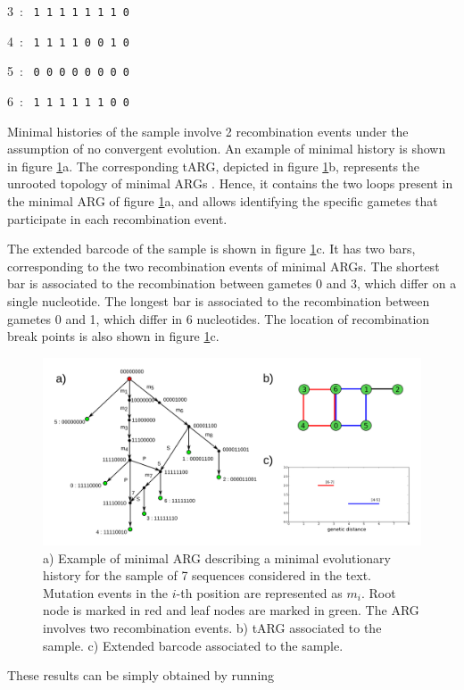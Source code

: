 \documentclass[12pt]{article}
\begin{document}
3\ : \ \texttt{1 1 1 1 1 1 1 0}

4\ : \ \texttt{1 1 1 1 0 0 1 0}

5\ : \ \texttt{0 0 0 0 0 0 0 0}

6\ : \ \texttt{1 1 1 1 1 1 0 0}

\noindent Minimal histories of the sample involve 2 recombination events under the assumption of no convergent evolution. An example of minimal history is shown in figure \ref{fig1}a. The corresponding tARG, depicted in figure \ref{fig1}b, represents the unrooted topology of minimal ARGs \cite{target}. Hence, it contains the two loops present in the minimal ARG of figure \ref{fig1}a, and allows identifying the specific gametes that participate in each recombination event. 

The extended barcode of the sample is shown in figure \ref{fig1}c. It has two bars, corresponding to the two recombination events of minimal ARGs. The shortest bar is associated to the recombination between gametes 0 and 3, which differ on a single nucleotide. The longest bar is associated to the recombination between gametes 0 and 1, which differ in 6 nucleotides. The location of recombination break points is also shown in figure \ref{fig1}c.

\begin{figure}[!ht]
\centering
\includegraphics[width=15.8cm, angle=0]{draw.png}
\caption{a) Example of minimal ARG describing a minimal evolutionary history for the sample of 7 sequences considered in the text. Mutation events in the $i$-th position are represented as $m_i$. Root node is marked in red and leaf nodes are marked in green. The ARG involves two recombination events. b) tARG associated to the sample. c) Extended barcode associated to the sample.
\label{fig1}}
\end{figure} 

\noindent These results can be simply obtained by running
\end{document}
